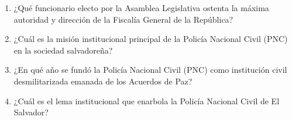 \documentclass[10pt,a4paper]{article}
\begin{document}
\begin{enumerate}[label=\textbf{\arabic*.}]
\begin{enumerate}[label=\textbf{\Alph*)}]
\end{enumerate}
\vspace{0.15cm}
\item ¿Qué funcionario electo por la Asamblea Legislativa ostenta la máxima autoridad y dirección de la Fiscalía General de la República?
\begin{enumerate}[label=\textbf{\Alph*)}]
\end{enumerate}
\vspace{0.15cm}
\item ¿Cuál es la misión institucional principal de la Policía Nacional Civil (PNC) en la sociedad salvadoreña?
\begin{enumerate}[label=\textbf{\Alph*)}]
\end{enumerate}
\vspace{0.15cm}
\item ¿En qué año se fundó la Policía Nacional Civil (PNC) como institución civil desmilitarizada emanada de los Acuerdos de Paz?
\begin{enumerate}[label=\textbf{\Alph*)}]
\end{enumerate}
\vspace{0.15cm}
\item ¿Cuál es el lema institucional que enarbola la Policía Nacional Civil de El Salvador?
\begin{enumerate}[label=\textbf{\Alph*)}]

\end{enumerate}
\end{enumerate}
\end{document}
